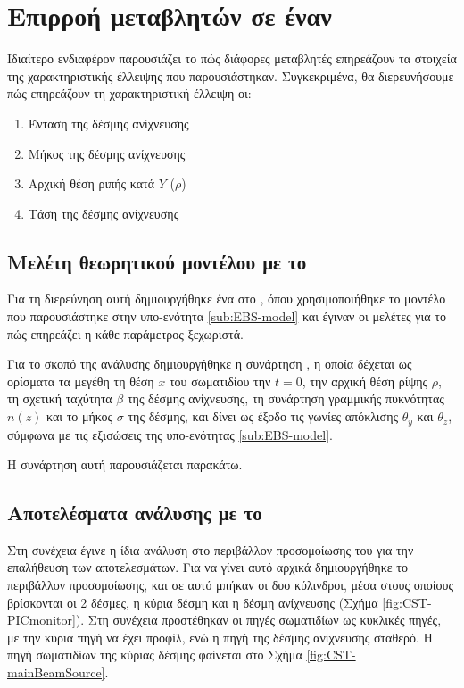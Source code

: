 \section{Επιρροή μεταβλητών σε έναν }

Ιδιαίτερο ενδιαφέρον παρουσιάζει το πώς διάφορες μεταβλητές επηρεάζουν τα στοιχεία της χαρακτηριστικής έλλειψης που παρουσιάστηκαν.
Συγκεκριμένα, θα διερευνήσουμε πώς επηρεάζουν τη χαρακτηριστική έλλειψη οι:
\begin{enumerate}
	\item Ένταση της δέσμης ανίχνευσης
	\item Μήκος της δέσμης ανίχνευσης
	\item Αρχική θέση ριπής κατά $Y$ ($\rho$) 
	\item Τάση της δέσμης ανίχνευσης
\end{enumerate}

\subsection{Μελέτη θεωρητικού μοντέλου με το } \label{sub:variable-analysis-MATLAB}
Για τη διερεύνηση αυτή δημιουργήθηκε ένα  στο , όπου χρησιμοποιήθηκε το μοντέλο που παρουσιάστηκε στην υπο-ενότητα \ref{sub:EBS-model} και έγιναν οι μελέτες για το πώς επηρεάζει η κάθε παράμετρος ξεχωριστά. 

Για το σκοπό της ανάλυσης δημιουργήθηκε η συνάρτηση , η οποία δέχεται ως ορίσματα τα μεγέθη τη θέση $x$ του σωματιδίου την $t = 0$, την αρχική θέση ρίψης $\rho$, τη σχετική ταχύτητα $\beta$ της δέσμης ανίχνευσης, τη συνάρτηση γραμμικής πυκνότητας$n(z)$ και το μήκος $\sigma$ της δέσμης, και δίνει ως έξοδο τις γωνίες απόκλισης $\theta_y$ και $\theta_z$, σύμφωνα με τις εξισώσεις της υπο-ενότητας \ref{sub:EBS-model}.

Η συνάρτηση αυτή παρουσιάζεται παρακάτω.



\subsection{Αποτελέσματα ανάλυσης με το }

Στη συνέχεια έγινε η ίδια ανάλυση στο περιβάλλον προσομοίωσης του  για την επαλήθευση των αποτελεσμάτων. 
Για να γίνει αυτό αρχικά δημιουργήθηκε το περιβάλλον προσομοίωσης, και σε αυτό μπήκαν οι  δυο κύλινδροι, μέσα στους οποίους βρίσκονται οι 2 δέσμες, η κύρια δέσμη και η δέσμη ανίχνευσης (Σχήμα \ref{fig:CST-PICmonitor}). 
Στη συνέχεια προστέθηκαν οι πηγές σωματιδίων ως κυκλικές πηγές, με την κύρια πηγή να έχει  προφίλ, ενώ η πηγή της δέσμης ανίχνευσης σταθερό. 
Η πηγή σωματιδίων της κύριας δέσμης φαίνεται στο Σχήμα \ref{fig:CST-mainBeamSource}.

